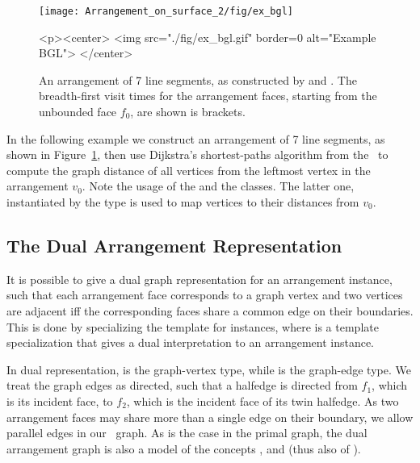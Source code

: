 \begin{figure}[t]
\begin{ccTexOnly}
  \begin{center}
  \texttt{[image: Arrangement\_on\_surface\_2/fig/ex\_bgl]}
  \end{center}
\end{ccTexOnly}
\begin{ccHtmlOnly}
  <p><center>
  <img src="./fig/ex_bgl.gif" border=0 alt="Example BGL">
  </center>
\end{ccHtmlOnly}
\caption{An arrangement of 7 line segments, as constructed by
 and .
The breadth-first visit times for the arrangement faces, starting
from the unbounded face $f_0$, are shown is brackets.}
\label{arr_fig:ex_bgl}
\end{figure}

In the following example we construct an arrangement of 7 line segments,
as shown in Figure~\ref{arr_fig:ex_bgl},
then use Dijkstra's shortest-paths algorithm from the \bgl\ to compute
the graph distance of all vertices from the leftmost vertex in the
arrangement $v_0$. Note the usage of the  and
the  classes. The
latter one, instantiated by the type  is used to map
vertices to their distances from $v_0$.


\subsection{The Dual Arrangement Representation\label{arr_ssec:bgl_dual}}

It is possible to give a dual graph representation for an arrangement instance,
such that each arrangement face corresponds to a graph vertex and two vertices
are adjacent iff the corresponding faces share a common edge on their
boundaries. This is done by specializing the
 template for  instances,
where  is a template specialization that gives a
dual interpretation to an arrangement instance.

In dual representation, 
is the graph-vertex type, while  is the
graph-edge type. We treat the graph edges as directed, such that a halfedge
 is directed from $f_1$, which is its incident face, to $f_2$, which
is the incident face of its twin halfedge. As two arrangement faces may
share more than a single edge on their boundary, we allow parallel
edges in our \boost\ graph. As is the case in the primal graph, the dual
arrangement graph is also a model of the concepts ,
 and  (thus also of 
).

